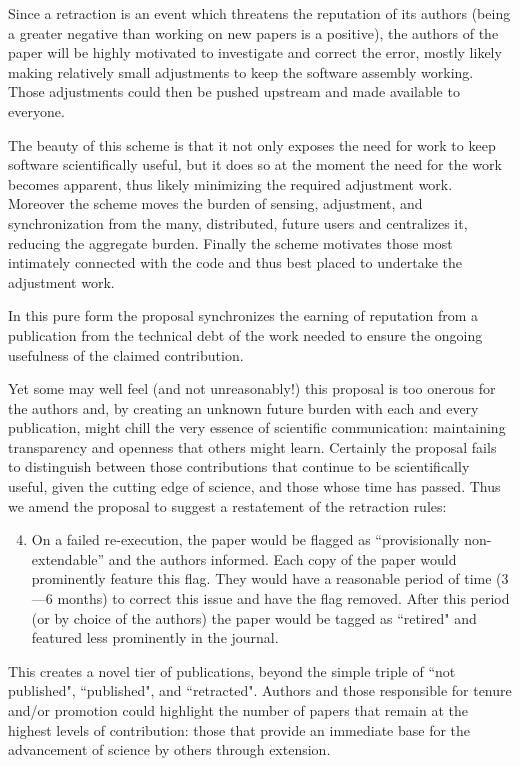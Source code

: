 \documentclass{sigchi}
\begin{document}
Since a retraction is an event which threatens the reputation of its authors (being a greater negative than working on new papers is a positive), the authors of the paper will be highly motivated to investigate and correct the error, mostly likely making relatively small adjustments to keep the software assembly working. Those adjustments could then be pushed upstream and made available to everyone.

The beauty of this scheme is that it not only exposes the need for work to keep software scientifically useful, but it does so at the moment the need for the work becomes apparent, thus likely minimizing the required adjustment work.  Moreover the scheme moves the burden of sensing, adjustment, and synchronization from the many, distributed, future users and centralizes it, reducing the aggregate burden. Finally the scheme motivates those most intimately connected with the code and thus best placed to undertake the adjustment work.

In this pure form the proposal synchronizes the earning of reputation from a publication from the technical debt of the work needed to ensure the ongoing usefulness of the claimed contribution.

Yet some may well feel (and not unreasonably!) this proposal is too onerous for the authors and, by creating an unknown future burden with each and every publication, might chill the very essence of scientific communication: maintaining transparency and openness that others might learn.  Certainly the proposal fails to distinguish between those contributions that continue to be scientifically useful, given the cutting edge of science, and those whose time has passed. Thus we amend the proposal to suggest a restatement of the retraction rules:

\begin{enumerate}
	\setcounter{enumi}{3}
\item On a failed re-execution, the paper would be flagged as ``provisionally non-extendable'' and the authors informed. Each copy of the paper would prominently feature this flag. They would have a reasonable period of time (3—6 months) to correct this issue and have the flag removed. After this period (or by choice of the authors) the paper would be tagged as ``retired" and featured less prominently in the journal.
\end{enumerate}

This creates a novel tier of publications, beyond the simple triple of ``not published", ``published", and ``retracted". Authors and those responsible for tenure and/or promotion could highlight the number of papers that remain at the highest levels of contribution: those that provide an immediate base for the advancement of science by others through extension.
\end{document}
